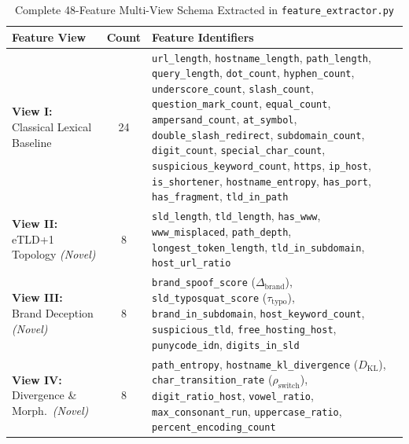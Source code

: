 \documentclass[12pt,a4paper]{report}
\begin{document}
\begin{table}[htbp]
\caption[Complete 48-Feature Multi-View Schema]{Complete 48-Feature Multi-View Schema Extracted in \texttt{feature\_extractor.py}}
\label{tab:all48}
\centering
\scriptsize
\renewcommand{\arraystretch}{1.14}
\begin{tabular}{p{2.2cm}cp{9.8cm}}
\toprule
\textbf{Feature View} & \textbf{Count} & \textbf{Feature Identifiers} \\
\midrule
\textbf{View I:} Classical Lexical Baseline & 24 & \texttt{url\_length}, \texttt{hostname\_length}, \texttt{path\_length}, \texttt{query\_length}, \texttt{dot\_count}, \texttt{hyphen\_count}, \texttt{underscore\_count}, \texttt{slash\_count}, \texttt{question\_mark\_count}, \texttt{equal\_count}, \texttt{ampersand\_count}, \texttt{at\_symbol}, \texttt{double\_slash\_redirect}, \texttt{subdomain\_count}, \texttt{digit\_count}, \texttt{special\_char\_count}, \texttt{suspicious\_keyword\_count}, \texttt{https}, \texttt{ip\_host}, \texttt{is\_shortener}, \texttt{hostname\_entropy}, \texttt{has\_port}, \texttt{has\_fragment}, \texttt{tld\_in\_path} \\
\midrule
\textbf{View II:} eTLD+1 Topology \emph{(Novel)} & 8 & \texttt{sld\_length}, \texttt{tld\_length}, \texttt{has\_www}, \texttt{www\_misplaced}, \texttt{path\_depth}, \texttt{longest\_token\_length}, \texttt{tld\_in\_subdomain}, \texttt{host\_url\_ratio} \\
\midrule
\textbf{View III:} Brand Deception \emph{(Novel)} & 8 & \texttt{brand\_spoof\_score} ($\Delta_{\text{brand}}$), \texttt{sld\_typosquat\_score} ($\tau_{\text{typo}}$), \texttt{brand\_in\_subdomain}, \texttt{host\_keyword\_count}, \texttt{suspicious\_tld}, \texttt{free\_hosting\_host}, \texttt{punycode\_idn}, \texttt{digits\_in\_sld} \\
\midrule
\textbf{View IV:} Divergence \& Morph.\ \emph{(Novel)} & 8 & \texttt{path\_entropy}, \texttt{hostname\_kl\_divergence} ($D_{\text{KL}}$), \texttt{char\_transition\_rate} ($\rho_{\text{switch}}$), \texttt{digit\_ratio\_host}, \texttt{vowel\_ratio}, \texttt{max\_consonant\_run}, \texttt{uppercase\_ratio}, \texttt{percent\_encoding\_count} \\
\bottomrule
\end{tabular}
\end{table}
\end{document}
